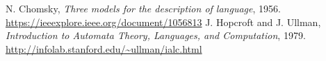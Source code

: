 \begin{thebibliography}{00}

 N. Chomsky, \emph{Three models for the description of language}, 1956. \url{https://ieeexplore.ieee.org/document/1056813}
 J. Hopcroft and J. Ullman, \emph{Introduction to Automata Theory, Languages, and Computation}, 1979. \url{http://infolab.stanford.edu/~ullman/ialc.html}

\end{thebibliography}
